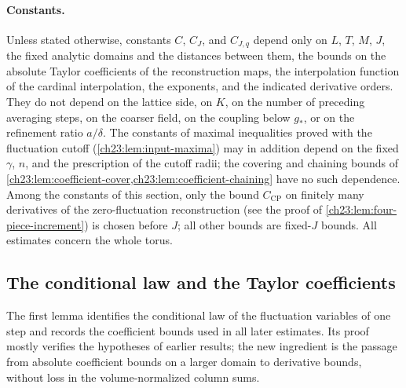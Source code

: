 \paragraph{Constants.}
Unless stated otherwise, constants $C$, $C_J$, and $C_{J,q}$ depend only on $L$, $T$, $M$, $J$, the fixed analytic domains and the distances between them, the bounds on the absolute Taylor coefficients of the reconstruction maps, the interpolation function of the cardinal interpolation, the exponents, and the indicated derivative orders. They do not depend on the lattice side, on $K$, on the number of preceding averaging steps, on the coarser field, on the coupling below $g_*$, or on the refinement ratio $a/\delta$. The constants of maximal inequalities proved with the fluctuation cutoff (\cref{ch23:lem:input-maxima}) may in addition depend on the fixed $\gamma$, $n$, and the prescription of the cutoff radii; the covering and chaining bounds of \cref{ch23:lem:coefficient-cover,ch23:lem:coefficient-chaining} have no such dependence. Among the constants of this section, only the bound $C_{\mathrm{CP}}$ on finitely many derivatives of the zero-fluctuation reconstruction (see the proof of \cref{ch23:lem:four-piece-increment}) is chosen before $J$; all other bounds are fixed-$J$ bounds. All estimates concern the whole torus.

\subsection{The conditional law and the Taylor coefficients}

The first lemma identifies the conditional law of the fluctuation variables of one step and records the coefficient bounds used in all later estimates. Its proof mostly verifies the hypotheses of earlier results; the new ingredient is the passage from absolute coefficient bounds on a larger domain to derivative bounds, without loss in the volume-normalized column sums.

